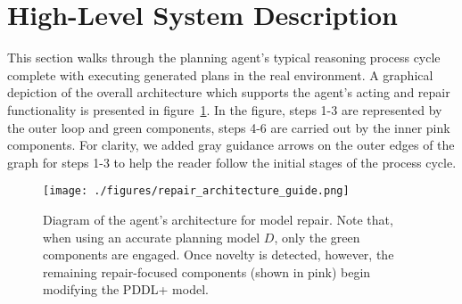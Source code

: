 \documentclass[letterpaper]{article} %
\begin{document}
\section{High-Level System Description}

This section walks through the planning agent's typical reasoning process cycle complete with executing generated plans in the real environment. A graphical depiction of the overall architecture which supports the agent's acting and repair functionality is presented in figure~\ref{fig:repair_architecture}. In the figure, steps 1-3 are represented by the outer loop and green components, steps 4-6 are carried out by the inner pink components. For clarity, we added gray guidance arrows on the outer edges of the graph for steps 1-3 to help the reader follow the initial stages of the process cycle. 

\begin{figure}
	\centering
	\texttt{[image: ./figures/repair\_architecture\_guide.png]}
	\caption{Diagram of the agent's architecture for model repair. Note that, when using an accurate planning model $D$, only the green components are engaged. Once novelty is detected, however, the remaining repair-focused components (shown in pink) begin modifying the PDDL+ model.}
	\label{fig:repair_architecture}
\end{figure}
\end{document}
